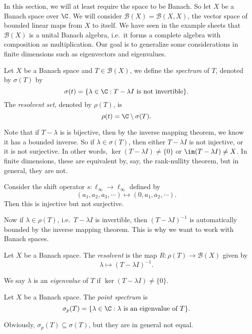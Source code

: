 \documentclass[a4paper]{article}
\begin{document}
In this section, we will at least require the space to be Banach. So let $X$ be a Banach space over $\C$. We will consider $\mathcal{B}(X) = \mathcal{B}(X, X)$, the vector space of bounded linear maps from $X$ to itself. We have seen in the example sheets that $\mathcal{B}(X)$ is a unital Banach algebra, i.e.\ it forms a complete algebra with composition as multiplication. Our goal is to generalize some considerations in finite dimensions such as eigenvectors and eigenvalues.

\begin{defi}
  Let $X$ be a Banach space and $T \in \mathcal{B}(X)$, we define the \emph{spectrum} of $T$, denoted by $\sigma(T)$ by
  \[
    \sigma(t) = \{\lambda \in \C: T - \lambda I\text{ is not invertible}\}.
  \]
  The \emph{resolvent set}, denoted by $\rho(T)$, is
  \[
    \rho(t) = \C \setminus \sigma(T).
  \]
\end{defi}
Note that if $T - \lambda$ is is bijective, then by the inverse mapping theorem, we know it has a bounded inverse. So if $\lambda \in \sigma(T)$, then either $T - \lambda I$ is not injective, or it is not surjective. In other words, $\ker (T - \lambda I) \not= \{0\}$ or $\im (T - \lambda I) \not= X$. In finite dimensions, these are equivalent by, say, the rank-nullity theorem, but in general, they are not.

\begin{eg}
  Consider the shift operator $s: \ell_\infty \to \ell_\infty$ defined by
  \[
    (a_1, a_2, a_3, \cdots) \mapsto (0, a_1, a_2, \cdots).
  \]
  Then this is injective but not surjective.
\end{eg}
Now if $\lambda \in \rho(T)$, i.e.\ $T - \lambda I$ is invertible, then $(T - \lambda I)^{-1}$ is automatically bounded by the inverse mapping theorem. This is why we want to work with Banach spaces.

\begin{defi}[Resolvent]
  Let $X$ be a Banach space. The \emph{resolvent} is the map $R: \rho(T) \to \mathcal{B}(X)$ given by
  \[
    \lambda \mapsto (T - \lambda I)^{-1}.
  \]
\end{defi}

\begin{defi}[Eigenvalue]
  We say $\lambda$ is an \emph{eigenvalue} of $T$ if $\ker (T - \lambda I) \not= \{0\}$.
\end{defi}

\begin{defi}
  Let $X$ be a Banach space. The \emph{point spectrum} is
  \[
    \sigma_p(T) = \{\lambda \in \C: \lambda\text{ is an eigenvalue of }T\}.
  \]
\end{defi}
Obviously, $\sigma_p(T) \subseteq \sigma(T)$, but they are in general not equal.
\end{document}

